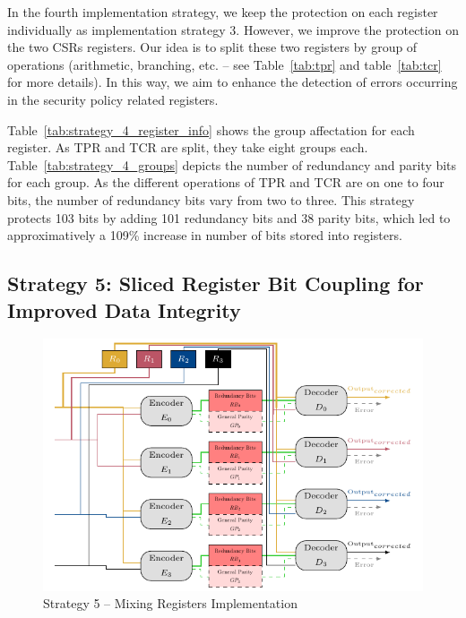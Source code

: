 In the fourth implementation strategy, we keep the protection on each register individually as implementation strategy 3. However, we improve the protection on the two CSRs registers. Our idea is to split these two registers by group of operations (arithmetic, branching, etc. -- see Table~\ref{tab:tpr} and table~\ref{tab:tcr} for more details). In this way, we aim to enhance the detection of errors occurring in the security policy related registers.

Table~\ref{tab:strategy_4_register_info} shows the group affectation for each register. As TPR and TCR are split, they take eight groups each.
Table~\ref{tab:strategy_4_groups} depicts the number of redundancy and parity bits for each group. As the different operations of TPR and TCR are on one to four bits, the number of redundancy bits vary from two to three. This strategy protects 103 bits by adding 101 redundancy bits and 38 parity bits, which led to approximatively a 109\% increase in number of bits stored into registers.

\subsection{Strategy 5: Sliced Register Bit Coupling for Improved Data Integrity}

\begin{figure}[ht]
    \centering
    \includegraphics[page=1]{c6_group_composition/img/implem5_spaghetti.pdf}
    \caption{Strategy 5 -- Mixing Registers Implementation}
    \label{fig:strategy_5_functionning}
\end{figure}

